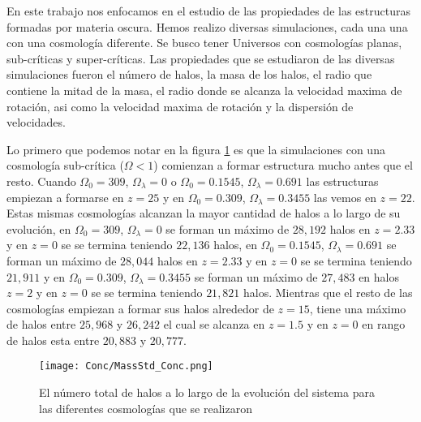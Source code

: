 \renewcommand{\altname}{Conclusiones}
\lhead[\fancyplain{}{}]%
      {\fancyplain{}{\bfseries \altname}}
\addchap{\altname}
En este trabajo nos enfocamos en el estudio de las propiedades de las estructuras formadas por materia oscura. Hemos realizo diversas simulaciones, cada una una con una cosmología diferente. Se busco tener Universos con cosmologías planas, sub-críticas y super-críticas. Las propiedades que se estudiaron de las diversas simulaciones fueron el número de halos, la masa de los halos, el radio que contiene la mitad de la masa, el radio donde se alcanza la velocidad maxima de rotación, asi como la velocidad maxima de rotación y la dispersión de velocidades.

Lo primero que podemos notar en la figura \ref{fig:Conc_TotalHalos} es que la simulaciones con una cosmología sub-crítica ($\Omega < 1$) comienzan a formar estructura mucho antes que el resto. Cuando $\Omega_0 = 309$, $\Omega_\lambda=0$ o $\Omega_0=0.1545$, $\Omega_\lambda=0.691$ las estructuras empiezan a formarse en $z=25$ y en $\Omega_0=0.309$, $\Omega_\lambda=0.3455$ las vemos en $z=22$. Estas mismas cosmologías alcanzan la mayor cantidad de halos a lo largo de su evolución, en $\Omega_0 = 309$, $\Omega_\lambda=0$ se forman un máximo de $28,192$ halos en $z=2.33$ y en $z=0$ se se termina teniendo $22,136$ halos, en $\Omega_0 = 0.1545$, $\Omega_\lambda=0.691$ se forman un máximo de $28,044$ halos en $z=2.33$ y en $z=0$ se se termina teniendo $21,911$ y en $\Omega_0 = 0.309$, $\Omega_\lambda=0.3455$ se forman un máximo de $27,483$ en halos $z=2$ y en $z=0$ se se termina teniendo $21,821$ halos. Mientras que el resto de las cosmologías empiezan a formar sus halos alrededor de $z=15$, tiene una máximo de halos entre $25,968$ y $26,242$ el cual se alcanza en $z=1.5$ y en $z=0$ en rango de halos esta entre $20,883$ y $20,777$.

\begin{figure}[H]
      \centering
      \texttt{[image: Conc/MassStd\_Conc.png]}
      \caption[Evolución del total de halos para todas las cosmologías]{El número total de halos a lo largo de la evolución del sistema para las diferentes cosmologías que se realizaron}
      \label{fig:Conc_TotalHalos}
\end{figure}

